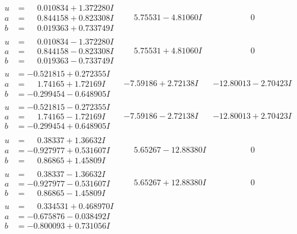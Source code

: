 \documentclass[1p]{elsarticle_modified}
\theoremstyle{definition}
\begin{document}
$$\begin{array}{c|c|c}
\begin{aligned}
u &= \phantom{-}0.010834 + 1.372280 I \\
a &= \phantom{-}0.844158 + 0.823308 I \\
b &= \phantom{-}0.019363 + 0.733749 I\end{aligned}
 & \phantom{-}5.75531 - 4.81060 I & \phantom{-0.000000 } 0 \\ \hline\begin{aligned}
u &= \phantom{-}0.010834 - 1.372280 I \\
a &= \phantom{-}0.844158 - 0.823308 I \\
b &= \phantom{-}0.019363 - 0.733749 I\end{aligned}
 & \phantom{-}5.75531 + 4.81060 I & \phantom{-0.000000 } 0 \\ \hline\begin{aligned}
u &= -0.521815 + 0.272355 I \\
a &= \phantom{-}1.74165 + 1.72169 I \\
b &= -0.299454 - 0.648905 I\end{aligned}
 & -7.59186 + 2.72138 I & -12.80013 - 2.70423 I \\ \hline\begin{aligned}
u &= -0.521815 - 0.272355 I \\
a &= \phantom{-}1.74165 - 1.72169 I \\
b &= -0.299454 + 0.648905 I\end{aligned}
 & -7.59186 - 2.72138 I & -12.80013 + 2.70423 I \\ \hline\begin{aligned}
u &= \phantom{-}0.38337 + 1.36632 I \\
a &= -0.927977 + 0.531607 I \\
b &= \phantom{-}0.86865 + 1.45809 I\end{aligned}
 & \phantom{-}5.65267 - 12.88380 I & \phantom{-0.000000 } 0 \\ \hline\begin{aligned}
u &= \phantom{-}0.38337 - 1.36632 I \\
a &= -0.927977 - 0.531607 I \\
b &= \phantom{-}0.86865 - 1.45809 I\end{aligned}
 & \phantom{-}5.65267 + 12.88380 I & \phantom{-0.000000 } 0 \\ \hline\begin{aligned}
u &= \phantom{-}0.334531 + 0.468970 I \\
a &= -0.675876 - 0.038492 I \\
b &= -0.800093 + 0.731056 I\end{aligned}

\end{array}$$
\end{document}
